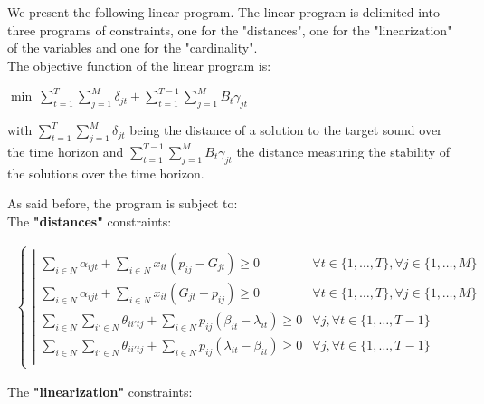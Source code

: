 \documentclass[a4paper]{book}
\begin{document}
We present the following linear program. The linear program is delimited into three programs of constraints, one for the "distances", one for the "linearization" of the variables and one for the "cardinality".\\
The objective function of the linear program is:

$\min \ \sum\limits_{t=1} ^ T \sum\limits_{j=1}^M \delta_{jt} + \sum\limits_{t=1}^{T-1} \sum\limits_{j=1}^M B_t \gamma_{jt}$

with $\sum\limits_{t=1} ^ T \sum\limits_{j=1}^M \delta_{jt}$ being the distance of a solution to the target sound over the time horizon and $\sum\limits_{t=1}^{T-1} \sum\limits_{j=1}^M B_t \gamma_{jt}$ the distance measuring the stability of the solutions over the time horizon. 

As said before, the program is subject to:\\
The \textbf{"distances"} constraints:


\begin{center}
   \begin{eqnarray*}
     \ \left \{ \begin{array}{ll}
     \left |
    \begin{array}{llll}
    \sum\limits_{i\in N} \alpha_{ijt}+\sum\limits_{i \in N} x_{it}(p_{ij}-G_{jt})\geq 0& \forall{t} \in \{1,\ldots,T\},\forall{j} \in \{1,\ldots,M\} \\
    \sum\limits_{i\in N} \alpha_{ijt}+\sum\limits_{i \in N} x_{it}(G_{jt}-p_{ij})\geq 0& \forall{t} \in \{1,\ldots,T\},\forall{j} \in \{1,\ldots,M\} \\
    \sum\limits_{i \in N} \sum \limits_{i' \in N} \theta_{ii'tj}+\sum\limits_{i\in N} p_{ij}(\beta_{it}-\lambda_{it})\geq 0 & \forall j,\forall t \in \{1,\ldots,T-1\}\\
   \sum\limits_{i \in N} \sum \limits_{i' \in N} \theta_{ii'tj}+\sum\limits_{i\in N} p_{ij}(\lambda_{it}-\beta_{it})\geq 0 & \forall j, \forall t \in \{1,\ldots,T-1\}\\
    \end{array}
    \right.
    \end{array} 
    \right.
    \end{eqnarray*}
    \end{center}

    
 
The \textbf{"linearization"} constraints:
\end{document}
